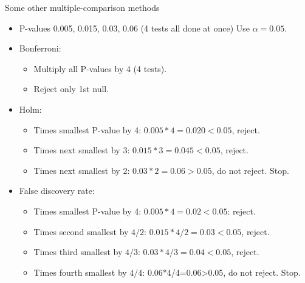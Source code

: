 \begin{frame}[fragile]{Some other multiple-comparison methods}

  \begin{itemize}
  \item P-values 0.005, 0.015, 0.03, 0.06 (4 tests all done at once)
Use $\alpha=0.05$.

\item Bonferroni: 
  \begin{itemize}
  \item 
Multiply all P-values by 4 (4 tests).
\item 
Reject only 1st null.
  \end{itemize}

\item Holm: 
  \begin{itemize}
  \item 
Times smallest P-value by 4: $0.005*4=0.020<0.05$, reject.
\item 
Times next smallest by 3: $0.015*3=0.045<0.05$, reject.
\item Times next smallest by 2: $0.03*2=0.06>0.05$, do not reject. Stop.
  \end{itemize}

\item False discovery rate:
  \begin{itemize}
  \item 
Times smallest P-value by 4: $0.005*4=0.02<0.05$: reject.
\item Times second smallest by $4/2$: $0.015*4/2=0.03<0.05$, reject.
\item Times third smallest by $4/3$: $0.03*4/3=0.04<0.05$, reject.
\item Times fourth smallest by $4/4$: 0.06*4/4=0.06>0.05, do not reject. Stop.
  \end{itemize}
  \end{itemize}
  
\end{frame}

